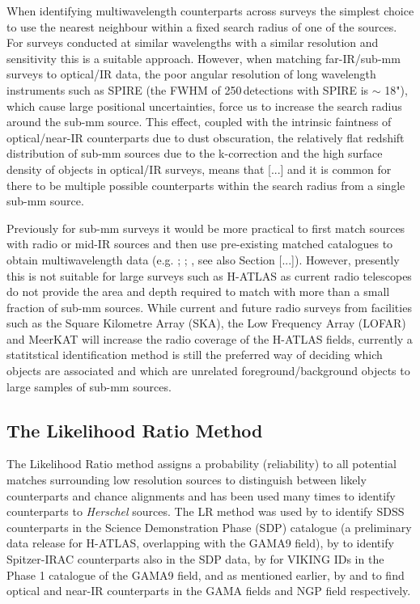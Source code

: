 When identifying multiwavelength counterparts across surveys the simplest choice to use the nearest neighbour within a fixed search radius of one of the sources. For surveys conducted at similar wavelengths with a similar resolution and sensitivity this is a suitable approach. However, when matching far-IR/sub-mm surveys to optical/IR data, the poor angular resolution of long wavelength instruments such as SPIRE (the FWHM of 250\,\micron detections with SPIRE is $\sim$ 18"), which cause large positional uncertainties, force us to increase the search radius around the sub-mm source. This effect, coupled with the intrinsic faintness of optical/near-IR counterparts due to dust obscuration, the relatively flat redshift distribution of sub-mm sources due to the k-correction and the high surface density of objects in optical/IR surveys, means that [...] and it is common for there to be multiple possible counterparts within the search radius from a single sub-mm source.

Previously for sub-mm surveys it would be more practical to first match sources with radio or mid-IR sources and then use pre-existing matched catalogues to obtain multiwavelength data (e.g. \citealt{Ivison_2007}; \citealt{Dye_2009}; \citealt{Biggs_2011}, see also Section [...]). However, presently this is not suitable for large surveys such as H-ATLAS as current radio telescopes do not provide the area and depth required to match with more than a small fraction of sub-mm sources. While current and future radio surveys from facilities such as the Square Kilometre Array (SKA), the Low Frequency Array (LOFAR) and MeerKAT will increase the radio coverage of the H-ATLAS fields, currently a statitstical identification method is still the preferred way of deciding which objects are associated and which are unrelated foreground/background objects to large samples of sub-mm sources.

\subsection{The Likelihood Ratio Method}
\label{sec:The Likelihood Ratio Method}

The Likelihood Ratio method assigns a probability (reliability) to all potential matches surrounding low resolution sources to distinguish between likely counterparts and chance alignments and has been used many times to identify counterparts to \textit{Herschel} sources. The LR method was used by \citealt{Smith_2011} to identify SDSS counterparts in the Science Demonstration Phase (SDP) catalogue (a preliminary data release for H-ATLAS, overlapping with the GAMA9 field), by \citealt{Kim_2012} to identify Spitzer-IRAC counterparts also in the SDP data, by \citealt{Fleuren_2012} for VIKING IDs in the Phase 1 catalogue of the GAMA9 field, and as mentioned earlier, by \citealt{Bourne_2016} and \citealt{Furlanetto_2018} to find optical and near-IR counterparts in the GAMA fields and NGP field respectively.

